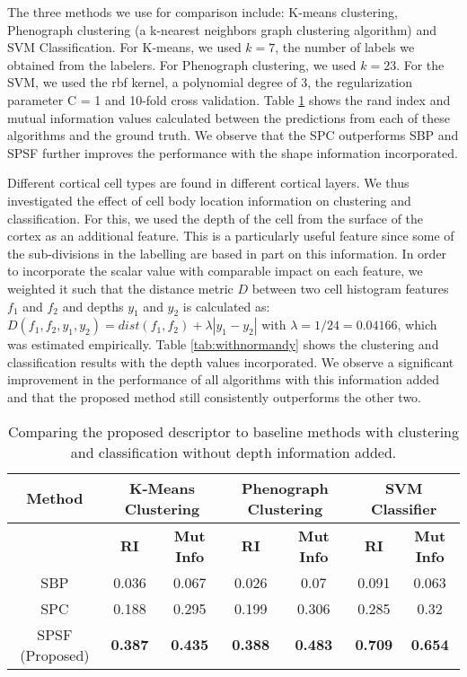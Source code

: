 \documentclass[runningheads]{llncs}
\begin{document}
The three methods we use for comparison include: K-means clustering, Phenograph clustering \cite{Levine2015Phenograph} (a k-nearest neighbors graph clustering algorithm) and SVM Classification. For K-means, we used $k=7$, the number of labels we obtained from the labelers. 
For Phenograph clustering, we used $k=23$. For the SVM, we used the rbf kernel, a polynomial degree of 3, the regularization parameter C = 1 and 10-fold cross validation. Table \ref{tab:withnorm} shows the rand index and mutual information values calculated between the predictions from each of these algorithms and the ground truth. We observe that the SPC outperforms SBP and SPSF further improves the performance with the shape information incorporated.

Different cortical cell types are found in different cortical layers. We thus investigated the effect of cell body location information on clustering and classification. For this, we used the depth of the cell from the surface of the cortex as an additional feature. This is a particularly useful feature since some of the sub-divisions in the labelling are based in part on this information. 
In order to incorporate the scalar value with comparable impact on each feature, we weighted it such that the distance metric $D$ between two cell histogram features $f_1$ and $f_2$ and depths $y_1$ and $y_2$ is calculated as:
$D(f_1,f_2,y_1,y_2) = dist(f_1,f_2) + \lambda |y_1-y_2|$
with $\lambda = 1/24 = 0.04166$, which was estimated empirically. Table \ref{tab:withnormandy} shows the clustering and classification results with the depth values incorporated. We observe a significant improvement in the performance of all algorithms with this information added and that the proposed method still consistently outperforms the other two.
\begin{table}
    \centering
    \begin{tabular}{|c|c|c|c|c|c|c|}
        \hline
        \textbf{Method} & \multicolumn{2}{|c|}{K-Means Clustering} & \multicolumn{2}{|c|}{Phenograph Clustering} & \multicolumn{2}{|c|}{SVM Classifier}  \\
        \hline
         & \textbf{RI} & \textbf{Mut Info} & \textbf{RI} & \textbf{Mut Info} & \textbf{RI} & \textbf{Mut Info}\\
        \hline
        SBP & 0.036 & 0.067 & 0.026 & 0.07 & 0.091 & 0.063 \\
        SPC & 0.188 & 0.295 & 0.199 & 0.306 & 0.285 & 0.32\\
        SPSF (Proposed)  & \textbf{0.387} & \textbf{0.435} & \textbf{0.388} & \textbf{0.483} & \textbf{0.709} & \textbf{0.654}\\
        \hline
    \end{tabular}
    \caption{Comparing the proposed descriptor to baseline methods with clustering and classification without depth information added. }
    \label{tab:withnorm}
\end{table}
\end{document}

